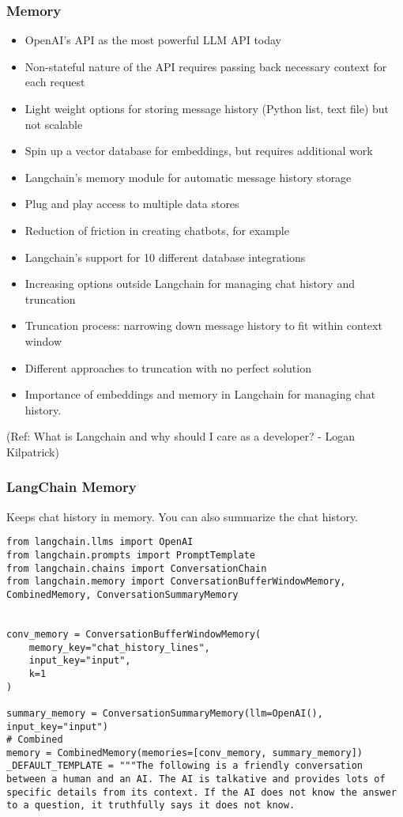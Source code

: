\begin{frame}[fragile]\frametitle{Memory}

\begin{itemize}
\item OpenAI's API as the most powerful LLM API today
\item Non-stateful nature of the API requires passing back necessary context for each request
\item Light weight options for storing message history (Python list, text file) but not scalable
\item Spin up a vector database for embeddings, but requires additional work
\item Langchain's memory module for automatic message history storage
\item Plug and play access to multiple data stores
\item Reduction of friction in creating chatbots, for example
\item Langchain's support for 10 different database integrations
\item Increasing options outside Langchain for managing chat history and truncation
\item Truncation process: narrowing down message history to fit within context window
\item Different approaches to truncation with no perfect solution
\item Importance of embeddings and memory in Langchain for managing chat history.
\end{itemize}

{\tiny (Ref: What is Langchain and why should I care as a developer? - Logan Kilpatrick)}

\end{frame}

\begin{frame}[fragile]\frametitle{LangChain Memory}

Keeps chat history in memory. You can also summarize the chat history.

\begin{lstlisting}
from langchain.llms import OpenAI
from langchain.prompts import PromptTemplate
from langchain.chains import ConversationChain
from langchain.memory import ConversationBufferWindowMemory, CombinedMemory, ConversationSummaryMemory


conv_memory = ConversationBufferWindowMemory(
    memory_key="chat_history_lines",
    input_key="input",
    k=1
)

summary_memory = ConversationSummaryMemory(llm=OpenAI(), input_key="input")
# Combined
memory = CombinedMemory(memories=[conv_memory, summary_memory])
_DEFAULT_TEMPLATE = """The following is a friendly conversation between a human and an AI. The AI is talkative and provides lots of specific details from its context. If the AI does not know the answer to a question, it truthfully says it does not know.

\end{lstlisting}	  

\end{frame}


